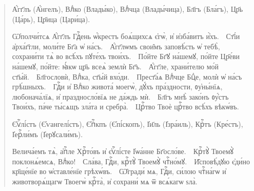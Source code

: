 \documentclass[11pt,a4paper,oneside]{memoir}
\newcommand{\exercise}{}
\begin{document}
    \begin{quote}\begin{slv}
        А҆́гг҃лъ (А҆́нгелъ), Влⷣко (Влады́ко), Влⷣчца (Влады́чица), Бл҃гъ (Бла́гъ), Цр҃ь (Ца́рь), Цр҃ица (Цари́ца).
        
        Ѡ҆полчи́тсѧ А҆́гг҃лъ Гдⷭ҇ень ѡ҆́крестъ боѧ́щихсѧ є҆гѡ̀, и҆ и҆зба́витъ и҆̀хъ.~\textemdash~Ст҃і́и а҆рха́г҃гли, моли́те Бг҃а ѡ҆ на́съ.~\textemdash~А҆́гг҃лѡмъ свои̑мъ заповѣ́сть ѡ҆ тебѣ̀, сохрани́ти тѧ̀ во всѣ́хъ пꙋте́хъ твои́хъ.~\textemdash~По́йте Бг҃ꙋ на́шемꙋ, по́йте Цр҃е́ви на́шемꙋ, по́йте: ꙗ҆́кѡ цр҃ь всеѧ̀ землѝ Бг҃ъ.~\textemdash~А҆́гг҃ле, храни́телю мо́й ст҃ы́й.~\textemdash~Бл҃гословѝ, Влⷣка, ст҃ы́й вхо́ди.~\textemdash~Прест҃а́ѧ Влⷣчце Бцⷣе, молѝ ѡ҆ на́съ грѣ́шныхъ.~\textemdash~Гдⷭ҇и и҆ Влⷣко живота́ моегѡ̀, дꙋ́хъ пра́здности, ᲂу҆ны́нїѧ, любонача́лїѧ, и҆ праздносло́вїѧ не да́ждь мѝ.~\textemdash~Бл҃гъ мнѣ̀ зако́нъ ᲂу҆́стъ Твои́хъ, па́че ты́сѧщъ зла́та и сребра̀.~\textemdash~Црⷭ҇тво Твоѐ црⷭ҇тво всѣ́хъ вѣкѡ́въ.
        
        Є҆ѵⷢ҇лі́стъ (Є҆ѵангелі́стъ), Є҆пⷭ҇кпъ (Є҆пі́скопъ), І҆и҃ль (І҆зра́иль), Крⷭ҇тъ (Кре́стъ), І҆ерⷭ҇ли́мъ (І҆ерꙋсали́мъ).
        
        Велича́емъ тѧ̀, а҆пⷭ҇ле Хрⷭ҇то́въ и҆ є҆ѵⷢ҇лі́сте І҆ѡа́нне Бг҃осло́ве.~\textemdash~Крⷭ҇тꙋ̀ Твоемꙋ̀ поклонѧ́емсѧ, Влⷣко!~\textemdash~Сла́ва, Гдⷭ҇и, крⷭ҇тꙋ̀ Твоемꙋ̀ чтⷭ҇но́мꙋ.~\textemdash~И̑сповѣ́дꙋю є҆ди́но кр҃ще́нїе во ѡ҆ставле́нїе грѣхѡ́въ.~\textemdash~Ѡ̑гради́ мѧ, Гдⷭ҇и, си́лою чтⷭ҇на́гѡ и҆ животворѧ́щагѡ Твоегѡ̀ крⷭ҇та̀, и҆ сохрани́ мѧ ѿ всѧ́кагѡ ѕла̀.
    \end{slv}\end{quote}
    \medskip

                    \paragraph{\exercise}
\end{document}
